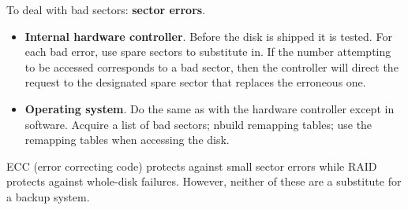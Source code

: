 \documentclass{article}
\newcommand{\bold}[1]{\textbf{#1}}
\renewcommand{\b}{\item[$\circ$]}
\newcommand{\newlist}{\begin{itemize}}
\renewcommand{\endlist}{\end{itemize}}
\begin{document}
To deal with bad sectors: \bold{sector errors}. 

\newlist 
\b \bold{Internal hardware controller}. Before the disk is shipped it is tested. For each bad error, use spare sectors to substitute in. If the number attempting to be accessed corresponds to a bad sector, then the controller will direct the request to the designated spare sector that replaces the erroneous one. 
\b \bold{Operating system}. Do the same as with the hardware controller except in software. Acquire a list of bad sectors; nbuild remapping tables; use the remapping tables when accessing the disk. 
\endlist 

ECC (error correcting code) protects against small sector errors while RAID protects against whole-disk failures. However, neither of these are a substitute for a backup system. 
\end{document}

